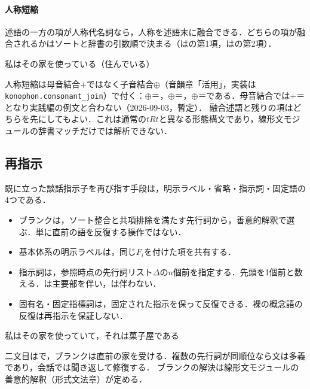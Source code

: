 \documentclass[../../main-detail.tex]{subfiles}
\begin{document}
\paragraph{人称短縮}
述語の一方の項が人称代名詞なら，人称を述語末に融合できる．どちらの項が融合されるかはソートと辞書の引数順で決まる（はの第1項，はの第2項）．
\begin{exe}
    \ex {}
    \ex {}
    \ex {}
    \glt 私はその家を使っている（住んでいる）
\end{exe}
人称短縮は母音結合$+$ではなく子音結合$\oplus$（音韻章「活用」，実装は\texttt{konophon.consonant\_join}）で付く：$\oplus$＝，$\oplus$＝，$\oplus$＝である．母音結合では+＝となり実践編の例文と合わない（2026-09-03，暫定）．
融合述語と残りの項はどちらを先にしてもよい．これは通常の$tRt$と異なる形態構文であり，線形文モジュールの辞書マッチだけでは解析できない．
\subsection{再指示}
既に立った談話指示子を再び指す手段は，明示ラベル・省略・指示詞・固定語の4つである．
\begin{itemize}
 \item ブランクは，ソート整合と共項排除を満たす先行詞から，善意的解釈で選ぶ．単に直前の語を反復する操作ではない．
 \item 基本体系の明示ラベルは，同じ$F_i$を付けた項を共有する．
 \item 指示詞は，参照時点の先行詞リスト$\Delta$の$n$個前を指定する．先頭を1個前と数える．は主要部を伴い，は伴わない．
 \item 固有名・固定指標詞は，固定された指示を保って反復できる．裸の概念語の反復は再指示を保証しない．
\end{itemize}
\begin{exe}
    \ex {}\hfill 私はその家を使っていて，それは菓子屋である
\end{exe}
二文目はで，ブランクは直前の家を受ける．複数の先行詞が同順位なら文は多義であり，会話では聞き返して修復する．
ブランクの解決は線形文モジュールの善意的解釈（形式文法章）が定める．
\end{document}
